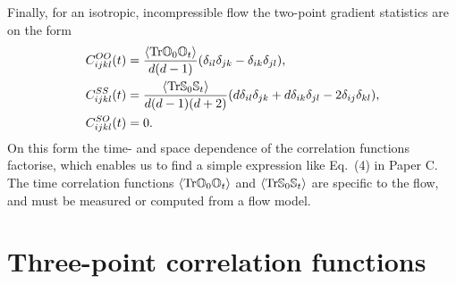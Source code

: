 \documentclass[thesis.tex]{subfiles}
\begin{document}
Finally, for an isotropic, incompressible flow the two-point gradient statistics are on the form
\begin{align}
	C^{OO}_{ijkl}(t) &= \frac{\left\langle \tr \ma O_0\ma O_t\right\rangle}{d(d-1)}( \delta_{il}\delta_{jk}-\delta_{ik}\delta_{jl}), \nn\\
	C^{SS}_{ijkl}(t) &= \frac{\left\langle \tr \ma S_0\ma S_t\right\rangle}{d(d-1)(d+2)}(d\delta_{il}\delta_{jk} + d\delta_{ik}\delta_{jl} - 2\delta_{ij}\delta_{kl}), \nn\\
	C^{SO}_{ijkl}(t) &= 0. \eqnlab{turbjpoint}
\end{align}
On this form the time- and space dependence of the correlation functions factorise, which enables us to find a simple expression like Eq.~(4) in Paper C. The time correlation functions $\left\langle \mbox{Tr} \mathbb{O}_0\mathbb{O}_t\right\rangle$ and $\left\langle \mbox{Tr} \mathbb{S}_0\mathbb{S}_t\right\rangle$ are specific to the flow, and must be measured or computed from a flow model.

\section{Three-point correlation functions}
\end{document}
